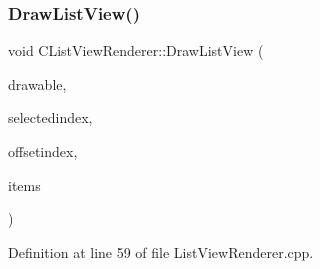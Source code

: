 \subsubsection{\texorpdfstring{Draw\+List\+View()}{DrawListView()}}
{\footnotesize\ttfamily void C\+List\+View\+Renderer\+::\+Draw\+List\+View (\begin{DoxyParamCaption}\item[{Gdk\+Drawable $\ast$}]{drawable,  }\item[{int}]{selectedindex,  }\item[{int}]{offsetindex,  }\item[{std\+::vector$<$ std\+::string $>$ \&}]{items }\end{DoxyParamCaption})}



Definition at line 59 of file List\+View\+Renderer.\+cpp.


